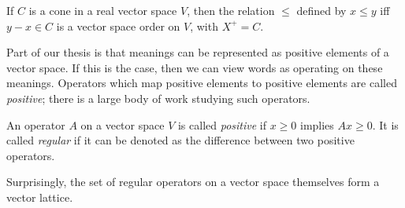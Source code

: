\documentclass{report}
\begin{document}
\begin{prop}
If $C$ is a cone in a real vector space $V$, then the relation $\le$ defined by $x \le y$ iff $y - x \in C$ is a vector space order on $V$, with $X^+ = C$.
\end{prop}

Part of our thesis is that meanings can be represented as positive elements of a vector space. If this is the case, then we can view words as operating on these meanings. Operators which map positive elements to positive elements are called \emph{positive}; there is a large body of work studying such operators.


\begin{defn}
An operator $A$ on a vector space $V$ is called \emph{positive} if $x \ge 0$ implies $Ax \ge 0$. It is called \emph{regular} if it can be denoted as the difference between two positive operators.
\end{defn}

Surprisingly, the set of regular operators on a vector space themselves form a vector lattice.

\begin{defn}
\end{defn}
\end{document}
